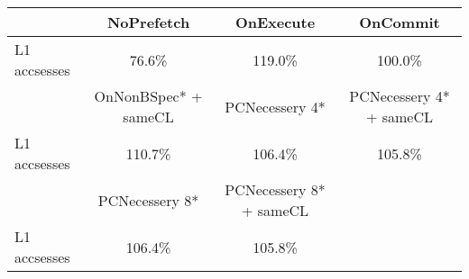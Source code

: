 \begin{tabular}{ l|ccc }
 & NoPrefetch & OnExecute & OnCommit\\ \hline
L1 accsesses & 76.6\% & 119.0\% & 100.0\%\\ \hline
\hline
 & OnNonBSpec* + sameCL & PCNecessery 4* & PCNecessery 4* + sameCL\\ \hline
L1 accsesses & 110.7\% & 106.4\% & 105.8\%\\ \hline
\hline
 & PCNecessery 8* & PCNecessery 8* + sameCL&\\ \hline
L1 accsesses & 106.4\% & 105.8\%&\\ \hline
\end{tabular}

